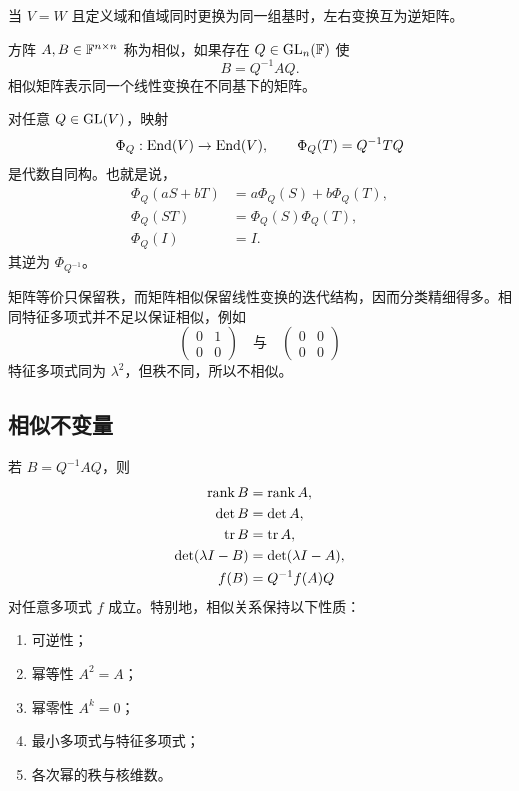 当 $V=W$ 且定义域和值域同时更换为同一组基时，左右变换互为逆矩阵。

\begin{definition}
方阵 $A,B\in\mathbb F^{n\times n}$ 称为相似，如果存在 $Q\in\operatorname{GL}_n(\mathbb F)$ 使
\begin{equation}
 B=Q^{-1}AQ.
\end{equation}
相似矩阵表示同一个线性变换在不同基下的矩阵。
\end{definition}

\begin{proposition}
对任意 $Q\in\operatorname{GL}(V)$，映射
\begin{equation}
 \Phi_Q:\operatorname{End}(V)\to\operatorname{End}(V),
 \qquad
 \Phi_Q(T)=Q^{-1}TQ
\end{equation}
是代数自同构。也就是说，
\begin{align}
 \Phi_Q(aS+bT)&=a\Phi_Q(S)+b\Phi_Q(T),\\
 \Phi_Q(ST)&=\Phi_Q(S)\Phi_Q(T),\\
 \Phi_Q(I)&=I.
\end{align}
其逆为 $\Phi_{Q^{-1}}$。
\end{proposition}

\begin{remark}
矩阵等价只保留秩，而矩阵相似保留线性变换的迭代结构，因而分类精细得多。相同特征多项式并不足以保证相似，例如
\begin{equation}
 \begin{pmatrix}0&1\\0&0\end{pmatrix}
 \quad\text{与}\quad
 \begin{pmatrix}0&0\\0&0\end{pmatrix}
\end{equation}
特征多项式同为 $\lambda^2$，但秩不同，所以不相似。
\end{remark}

\subsection{相似不变量}

若 $B=Q^{-1}AQ$，则
\begin{align}
 \operatorname{rank} B&=\operatorname{rank} A,\\
 \det B&=\det A,\\
 \operatorname{tr} B&=\operatorname{tr} A,\\
 \det(\lambda I-B)&=\det(\lambda I-A),\\
 f(B)&=Q^{-1}f(A)Q
\end{align}
对任意多项式 $f$ 成立。特别地，相似关系保持以下性质：
\begin{enumerate}
  \item 可逆性；
  \item 幂等性 $A^2=A$；
  \item 幂零性 $A^k=0$；
  \item 最小多项式与特征多项式；
  \item 各次幂的秩与核维数。
\end{enumerate}

